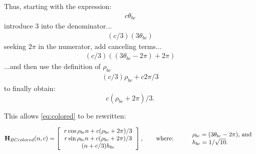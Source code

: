 \documentclass[10pt,final]{journals-1.0/asme2ej}
\renewcommand{\vec}[1]{\mathbf{#1}}
\begin{document}


Thus, starting with the expression:
\begin{align*}
  c \theta_{bc} 
\end{align*}
introduce 3 into the denominator...
\begin{align*}
  (c/3)  (3 \theta_{bc}) 
\end{align*}
seeking $2\pi$ in the numerator, add canceling terms...
\begin{align*}
  (c/ 3) ((3 \theta_{bc} - 2 \pi)  + 2 \pi) 
\end{align*}
...and then use the definition of $\rho_{bc}$
\begin{align*}
  (c / 3) \rho_{bc}  + c 2 \pi /3 
\end{align*}
to finally obtain:
\begin{equation}
  c  ( \rho_{bc} +  2 \pi) /3  \text{.}
\end{equation}  

This allows \cref{eq:colored} to be rewritten:

\begin{equation}
\vec{H}_{BCcolored}(n,c) =
\left [
  \begin{tabular}{c}
    $ r  \cos{\rho_{bc} n + c (\rho_{bc} +  2 \pi) /3} $\\
   $ r  \sin{\rho_{bc} n + c (\rho_{bc} +  2 \pi) /3} $\\
   $ (n+c/3)  h_{bc} $
  \end{tabular}
  \right ],
\text{\qquad where: \qquad}
  \begin{tabular}{l}
    $\rho_{bc} = (3 \theta_{bc} - 2 \pi)$, and \\
    $ h_{bc} = 1/\sqrt{10} $. \\    
  \end{tabular}      
\end{equation}
\end{document}

